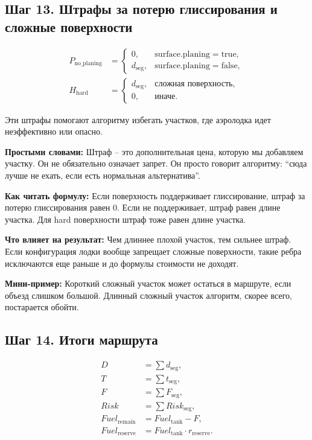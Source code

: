 \documentclass[12pt,a4paper]{article}
\newcommand{\simple}[1]{\par\smallskip\noindent\textbf{Простыми словами:} #1\par}
\newcommand{\howto}[1]{\par\smallskip\noindent\textbf{Как читать формулу:} #1\par}
\newcommand{\effect}[1]{\par\smallskip\noindent\textbf{Что влияет на результат:} #1\par}
\newcommand{\exampletext}[1]{\par\smallskip\noindent\textbf{Мини-пример:} #1\par}
\begin{document}
\subsection{Шаг 13. Штрафы за потерю глиссирования и сложные поверхности}

\begin{align}
P_{\mathrm{no\_planing}} &=
\begin{cases}
0, & \mathrm{surface.planing}=\mathrm{true}, \\
d_{\mathrm{seg}}, & \mathrm{surface.planing}=\mathrm{false},
\end{cases} \\
H_{\mathrm{hard}} &=
\begin{cases}
d_{\mathrm{seg}}, & \text{сложная поверхность}, \\
0, & \text{иначе}.
\end{cases}
\end{align}

Эти штрафы помогают алгоритму избегать участков, где аэролодка идет
неэффективно или опасно.

\simple{Штраф -- это дополнительная цена, которую мы добавляем участку. Он не
обязательно означает запрет. Он просто говорит алгоритму: ``сюда лучше не ехать,
если есть нормальная альтернатива''.}
\howto{Если поверхность поддерживает глиссирование, штраф за потерю
глиссирования равен 0. Если не поддерживает, штраф равен длине участка. Для hard
поверхности штраф тоже равен длине участка.}
\effect{Чем длиннее плохой участок, тем сильнее штраф. Если конфигурация лодки
вообще запрещает сложные поверхности, такие ребра исключаются еще раньше и до
формулы стоимости не доходят.}
\exampletext{Короткий сложный участок может остаться в маршруте, если объезд
слишком большой. Длинный сложный участок алгоритм, скорее всего, постарается
обойти.}

\subsection{Шаг 14. Итоги маршрута}

\begin{align}
D &= \sum d_{\mathrm{seg}}, \\
T &= \sum t_{\mathrm{seg}}, \\
F &= \sum F_{\mathrm{seg}}, \\
Risk &= \sum Risk_{\mathrm{seg}}, \\
Fuel_{\mathrm{remain}} &= Fuel_{\mathrm{tank}} - F, \\
Fuel_{\mathrm{reserve}} &= Fuel_{\mathrm{tank}}\cdot r_{\mathrm{reserve}}.
\end{align}
\end{document}
